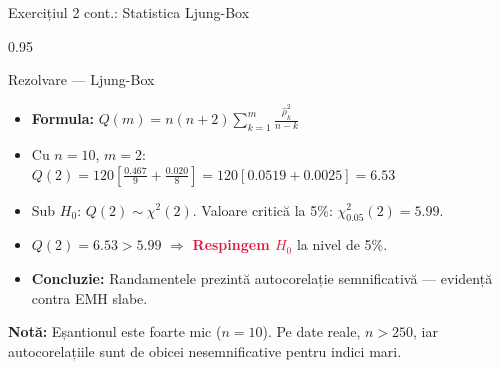 \documentclass[9pt, aspectratio=169, t]{beamer}
\begin{document}
\begin{frame}{Exercițiul 2 cont.: Statistica Ljung-Box}
    \begin{cminipage}{0.95\textwidth}
\begin{exampleblock}{Rezolvare --- Ljung-Box}
\small
\begin{itemize}\setlength{\itemsep}{0pt}
    \item \textbf{Formula:}
$Q(m) = n(n+2)\sum_{k=1}^{m}\frac{\hat\rho_k^2}{n-k}$
    \item Cu $n = 10$, $m = 2$:
$Q(2) = 120 \left[\frac{0.467}{9} + \frac{0.020}{8}\right]
= 120 [0.0519 + 0.0025] = \mathbf{6.53}$
    \item Sub $H_0$: $Q(2) \sim \chi^2(2)$. Valoare critică la 5\%: $\chi^2_{0.05}(2) = 5.99$.
    \item $Q(2) = 6.53 > 5.99$ $\Rightarrow$ \textcolor{Crimson}{\textbf{Respingem $H_0$}} la nivel de 5\%.
    \item \textbf{Concluzie:} Randamentele prezintă autocorelație semnificativă --- evidență contra EMH slabe.
\end{itemize}
\end{exampleblock}

\begin{alertblock}{}
    {\small \textbf{Notă:} Eșantionul este foarte mic ($n=10$). Pe date reale, $n > 250$, iar autocorelațiile sunt de obicei nesemnificative pentru indici mari.}
\end{alertblock}

    \end{cminipage}
\end{frame}
\end{document}
